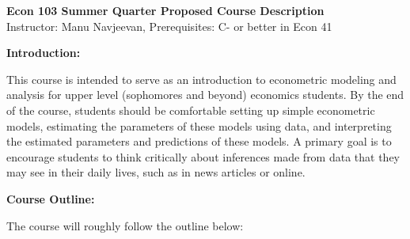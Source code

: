 \documentclass[10pt]{article}
\title{}
\author{Manu Navjeevan}
\date{\today}
\theoremstyle{exampstyle}
\begin{document}
{\bf \Large Econ 103 Summer Quarter Proposed Course Description}\\{\small Instructor: Manu Navjeevan, Prerequisites: C- or better in Econ 41} 

{\bf \large Introduction:}

This course is intended to serve as an introduction to econometric modeling and analysis for upper level (sophomores and beyond) economics students. By the end of the course, students should be comfortable setting up simple econometric models, estimating the parameters of these models using data, and interpreting the estimated parameters and predictions of these models. A primary goal is to encourage students to think critically about inferences made from data that they may see in their daily lives, such as in news articles or online.

{\bf \large Course Outline:}

The course will roughly follow the outline below: 
\end{document}
